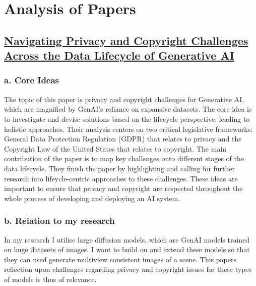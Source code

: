 \documentclass[11pt]{article}
\begin{document}
\section{Analysis of Papers}

\subsection*{\href{https://arxiv.org/abs/2311.18252v2}{Navigating Privacy and Copyright Challenges Across the Data Lifecycle of Generative AI}}
\subsubsection*{a. Core Ideas}
The topic of this paper is privacy and copyright challenges for Generative AI, which are magnified by GenAI's reliance on expansive datasets. The core idea is to investigate and devise solutions based on the lifecycle perspective, leading to holistic approaches. Their analysis centers on two critical legislative frameworks: General Data Protection Regulation (GDPR) that relates to privacy and the Copyright Law of the United States that relates to copyright. The main contribution of the paper is to map key challenges onto different stages of the data lifecycle. They finish the paper by highlighting and calling for further research into lifeycle-centric approaches to these challenges. These ideas are important to ensure that privacy and copyright are respected throughout the whole process of developing and deploying an AI system. 

\subsubsection*{b. Relation to my research}
In my research I utilise large diffusion models, which are GenAI models trained on huge datasets of images. I want to build on and extend these models so that they can used generate multiview consistent images of a scene. This papers reflection upon challenges regarding privacy and copyright issues for these types of models is thus of relevance. 
\end{document}
